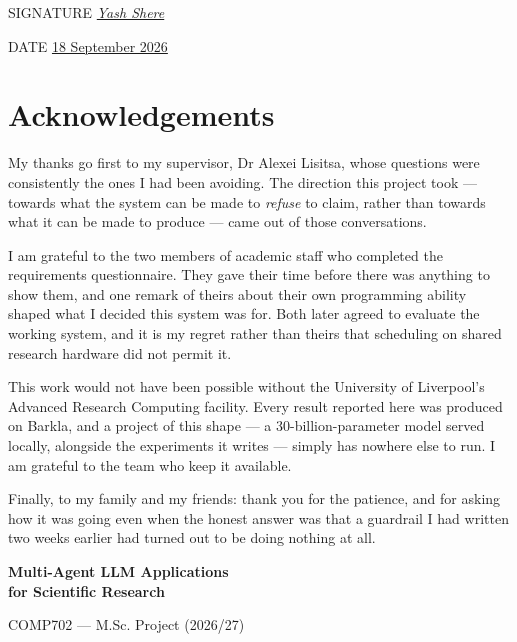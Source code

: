 \vspace{2cm}
\noindent SIGNATURE \hspace{0.5em}\underline{\hspace{1em}\textit{Yash Shere}\hspace{1em}}\hfill

\vspace{1cm}
\noindent DATE \hspace{0.5em}\underline{\hspace{1em}18 September 2026\hspace{1em}}\hfill

\chapter*{Acknowledgements}
My thanks go first to my supervisor, Dr Alexei Lisitsa, whose questions were
consistently the ones I had been avoiding. The direction this project took ---
towards what the system can be made to \emph{refuse} to claim, rather than
towards what it can be made to produce --- came out of those conversations.

I am grateful to the two members of academic staff who completed the
requirements questionnaire. They gave their time before there was anything to
show them, and one remark of theirs about their own programming ability shaped
what I decided this system was for. Both later agreed to evaluate the working
system, and it is my regret rather than theirs that scheduling on shared
research hardware did not permit it.

This work would not have been possible without the University of Liverpool's
Advanced Research Computing facility. Every result reported here was produced on
Barkla, and a project of this shape --- a 30-billion-parameter model served
locally, alongside the experiments it writes --- simply has nowhere else to run.
I am grateful to the team who keep it available.

Finally, to my family and my friends: thank you for the patience, and for
asking how it was going even when the honest answer was that a guardrail I had
written two weeks earlier had turned out to be doing nothing at all.

\clearpage
\thispagestyle{empty}
\vspace*{4cm}
\begin{center}
{\LARGE\bfseries Multi-Agent LLM Applications\\[0.3em] for Scientific Research\par}
\vspace{1cm}
{\large COMP702 --- M.Sc. Project (2026/27)\par}
\end{center}
\clearpage

